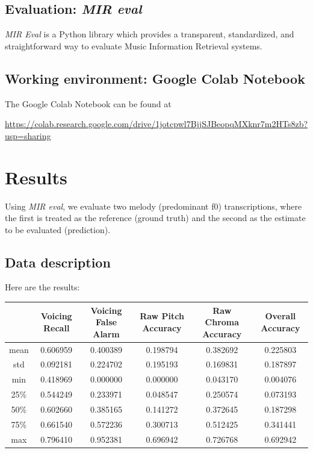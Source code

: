 \documentclass{article}
\begin{document}
\subsection{Evaluation: \textit{MIR eval}}
\textit{MIR Eval} is a Python library which provides a transparent, standardized, and straightforward way to evaluate Music Information Retrieval systems.

\subsection{Working environment: Google Colab Notebook}
The Google Colab Notebook can be found at
\begin{center}
	\url{https://colab.research.google.com/drive/1jotcpwl7BjjSJBeopqMXknr7m2HTs8zb?usp=sharing}
\end{center}

\section{Results}
Using \textit{MIR eval}, we evaluate two melody (predominant f0) transcriptions, where the first is treated as the reference (ground truth) and the second as the estimate to be evaluated (prediction).
\subsection{Data description}
Here are the results:
\begin{center}
\centering
\begin{tabular}{||c c c c c c||} 
 \hline
& Voicing Recall & Voicing False Alarm & Raw Pitch Accuracy & Raw Chroma Accuracy & Overall Accuracy \\
 \hline\hline
 mean & 0.606959 &	0.400389 &	0.198794 &	0.382692 &	0.225803 \\
 \hline
 std & 0.092181	& 0.224702 &	0.195193 &	0.169831 &	0.187897 \\
 \hline
 min & 0.418969 & 	0.000000 & 	0.000000 & 	0.043170 & 	0.004076 \\
 \hline
 25\% & 0.544249 & 	0.233971 & 	0.048547 & 	0.250574 & 	0.073193 \\
 \hline
 50\% & 0.602660 & 	0.385165 & 	0.141272 & 	0.372645 & 	0.187298 \\
  \hline
 75\% & 0.661540 & 	0.572236 & 	0.300713	& 0.512425 & 0.341441 \\
  \hline
 max & 0.796410	& 0.952381	& 0.696942	& 0.726768	& 0.692942 \\
\end{tabular}
\end{center}
\end{document}
